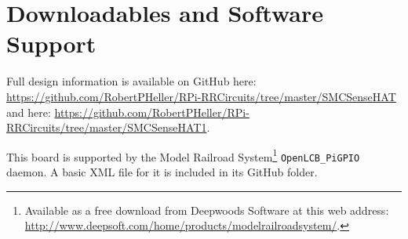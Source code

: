 \section{Downloadables and Software Support}

Full design information is available on GitHub here: 
\url{https://github.com/RobertPHeller/RPi-RRCircuits/tree/master/SMCSenseHAT} 
and here:
\url{https://github.com/RobertPHeller/RPi-RRCircuits/tree/master/SMCSenseHAT1}.

This board is supported by the Model Railroad System\footnote{Available as a 
free download from Deepwoods Software at this web address: 
\url{http://www.deepsoft.com/home/products/modelrailroadsystem/}.}
\texttt{OpenLCB\_PiGPIO} daemon. A basic XML file for it is included in its
GitHub folder.

